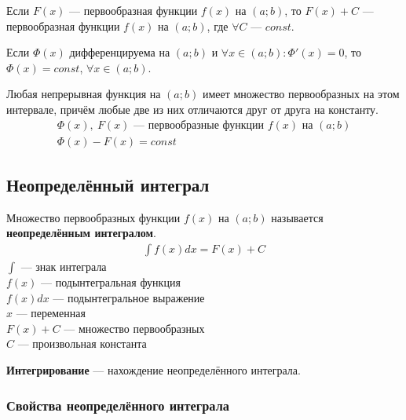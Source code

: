     \begin{property}
        Если $F(x)$ --- первообразная функции $f(x)$ на $(a;b)$, то $F(x) + C$ --- первообразная функции $f(x)$ на $(a;b)$, где $\forall C$ --- $const$.
    \end{property}
    \begin{property}
        \sloppy Если $\varPhi(x)$ дифференцируема на $(a;b)$ и $\forall x \in (a;b)\colon \varPhi'(x) = 0$, то $\varPhi (x) = const$, ${\forall x \in (a;b)}$.
    \end{property}
    \begin{property}
        Любая непрерывная функция на $(a;b)$ имеет множество первообразных на этом интервале, причём любые две из них отличаются друг от друга на константу.
        \begin{gather*}
            \varPhi(x),\ F(x) \text{ --- первообразные функции } f(x) \text{ на } (a;b) \\
            \varPhi(x) - F(x) = const
        \end{gather*}
    \end{property}

\newpage
\subsection{Неопределённый интеграл}

\begin{definition}
    Множество первообразных функции $f(x)$ на $(a;b)$ называется \textbf{неопределённым интегралом}.
    \begin{gather}
        \boxed{\int f(x)dx = F(x) + C}
    \end{gather}
    $\int$ --- знак интеграла\\
    $f(x)$ --- подынтегральная функция\\
    $f(x)dx$ --- подынтегральное выражение\\
    $x$ --- переменная\\
    $F(x) + C$ --- множество первообразных\\
    $C$ --- произвольная константа
\end{definition}

\begin{definition}
    \textbf{Интегрирование} --- нахождение неопределённого интеграла.
\end{definition}

\subsubsection{Свойства неопределённого интеграла}
\setcounter{property}{0}

